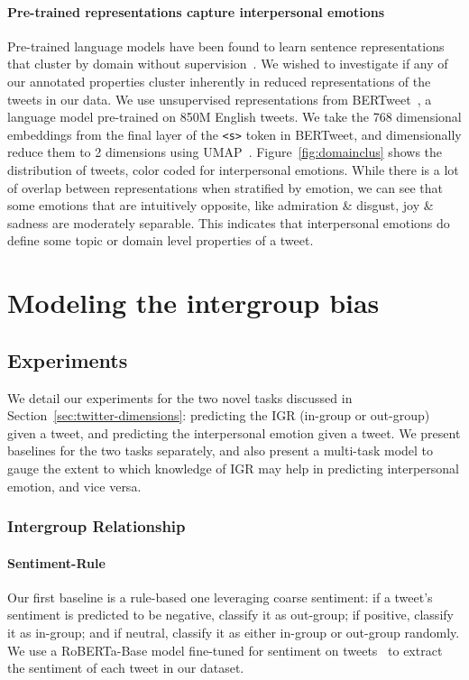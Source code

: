 \paragraph{Pre-trained representations capture interpersonal emotions} Pre-trained language models have been found to learn sentence representations that cluster by domain without supervision~\citep{aharoni-goldberg-2020-unsupervised}. We wished to investigate if any of our annotated properties cluster inherently in reduced representations of the tweets in our data. We use unsupervised representations from BERTweet~\citep{nguyen_bertweet_2020}, a language model pre-trained on 850M English tweets. We take the 768 dimensional embeddings from the final layer of the \texttt{<s>} token in BERTweet, and dimensionally reduce them to 2 dimensions using UMAP~\citep{sainburg2021parametric}. Figure~\ref{fig:domainclus} shows the distribution of tweets, color coded for interpersonal emotions. While there is a lot of overlap between representations when stratified by emotion, we can see that some emotions that are intuitively opposite, like admiration \& disgust, joy \& sadness are moderately separable. This indicates that interpersonal emotions do define some topic or domain level properties of a tweet.

\section{Modeling the intergroup bias}
\label{sec:twitter-model}

\subsection{Experiments}

We detail our experiments for the two novel tasks discussed in Section~\ref{sec:twitter-dimensions}: predicting the IGR (in-group or out-group) given a tweet, and predicting the interpersonal emotion given a tweet. We present baselines for the two tasks separately, and also present a multi-task model to gauge the extent to which knowledge of IGR may help in predicting interpersonal emotion, and vice versa.

\subsubsection{Intergroup Relationship}

\paragraph{Sentiment-Rule} Our first baseline is a rule-based one leveraging coarse sentiment: if a tweet's sentiment is predicted to be negative, classify it as out-group; if positive, classify it as in-group; and if neutral, classify it as either in-group or out-group randomly. We use a RoBERTa-Base model fine-tuned for sentiment on tweets~\citep{barbieri-etal-2020-tweeteval} to extract the sentiment of each tweet in our dataset.
    
